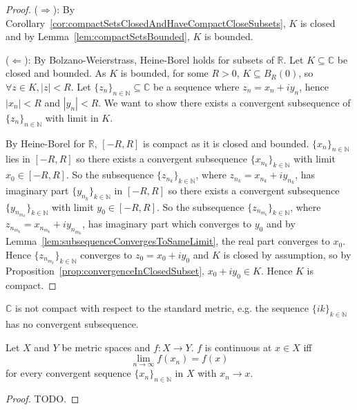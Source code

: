 \begin{proof}
	($\Rightarrow$): By Corollary~\ref{cor:compactSetsClosedAndHaveCompactCloseSubsets}, $K$ is closed and by Lemma~\ref{lem:compactSetsBounded}, $K$ is bounded.

	($\Leftarrow$): By Bolzano-Weierstrass, Heine-Borel holds for subsets of $\mathbb{R}$. Let $K \subseteq \mathbb{C}$ be closed and bounded. As $K$ is bounded, for some $R > 0$, $K \subseteq B_R(0)$, so $\forall z \in K, |z| < R$. Let $\{ z_n \}_{n \in \mathbb{N}} \subseteq \mathbb{C}$ be a sequence where $z_n = x_n + i y_n$, hence $|x_n| < R$ and $|y_n| < R$. We want to show there exists a convergent subsequence of $\{ z_n \}_{n \in \mathbb{N}}$ with limit in $K$.

	By Heine-Borel for $\mathbb{R}$, $[-R, R]$ is compact as it is closed and bounded. $\{ x_n \}_{n \in \mathbb{N}}$ lies in $[-R, R]$ so there exists a convergent subsequence $\{ x_{n_k} \}_{k \in \mathbb{N}}$ with limit $x_0 \in [-R, R]$. So the subsequence $\{ z_{n_k} \}_{k \in \mathbb{N}}$, where $z_{n_k} = x_{n_k} + i y_{n_k}$, has imaginary part $\{ y_{n_k} \}_{k \in \mathbb{N}}$ in $[-R, R]$ so there exists a convergent subsequence $\{ y_{n_{m_k}} \}_{k \in \mathbb{N}}$ with limit $y_0 \in [-R, R]$. So the subsequence $\{ z_{n_{m_k}} \}_{k \in \mathbb{N}}$, where $z_{n_{m_k}} = x_{n_{m_k}} + i y_{n_{m_k}}$, has imaginary part which converges to $y_0$ and by Lemma~\ref{lem:subsequenceConvergesToSameLimit}, the real part converges to $x_0$. Hence $\{ z_{n_{m_k}} \}_{k \in \mathbb{N}}$ converges to $z_0 = x_0 + i y_0$ and $K$ is closed by assumption, so by Proposition~\ref{prop:convergenceInClosedSubset}, $x_0 + i y_0 \in K$. Hence $K$ is compact.
\end{proof}

\begin{example}
	$\mathbb{C}$ is not compact with respect to the standard metric, e.g. the sequence $\{ ik \}_{k \in \mathbb{N}}$ has no convergent subsequence.
\end{example}

\begin{lemma}\label{lem:continuityViaSequences}
	Let $X$ and $Y$ be metric spaces and $f: X \to Y$. $f$ is continuous at $x \in X$ iff
	\[
		\lim_{n \to \infty} f(x_n) = f(x)
	\]
	for every convergent sequence $\{ x_n \}_{n \in \mathbb{N}}$ in $X$ with $x_n \to x$.
\end{lemma}

\begin{proof}
	TODO.
\end{proof}

